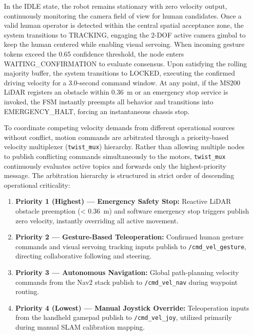 In the IDLE state, the robot remains stationary with zero velocity output, continuously monitoring the camera field of view for human candidates. Once a valid human operator is detected within the central spatial acceptance zone, the system transitions to TRACKING, engaging the 2-DOF active camera gimbal to keep the human centered while enabling visual servoing. When incoming gesture tokens exceed the 0.65 confidence threshold, the node enters WAITING\_CONFIRMATION to evaluate consensus. Upon satisfying the rolling majority buffer, the system transitions to LOCKED, executing the confirmed driving velocity for a 3.0-second command window. At any point, if the MS200 LiDAR registers an obstacle within 0.36~m or an emergency stop service is invoked, the FSM instantly preempts all behavior and transitions into EMERGENCY\_HALT, forcing an instantaneous chassis stop.

To coordinate competing velocity demands from different operational sources without conflict, motion commands are arbitrated through a priority-based velocity multiplexer (\texttt{twist\_mux}) hierarchy. Rather than allowing multiple nodes to publish conflicting commands simultaneously to the motors, \texttt{twist\_mux} continuously evaluates active topics and forwards only the highest-priority message. The arbitration hierarchy is structured in strict order of descending operational criticality:
\begin{enumerate}
    \item \textbf{Priority 1 (Highest) — Emergency Safety Stop:} Reactive LiDAR obstacle preemption (< 0.36~m) and software emergency stop triggers publish zero velocity, instantly overriding all active movement.
    \item \textbf{Priority 2 — Gesture-Based Teleoperation:} Confirmed human gesture commands and visual servoing tracking inputs publish to \texttt{/cmd\_vel\_gesture}, directing collaborative following and steering.
    \item \textbf{Priority 3 — Autonomous Navigation:} Global path-planning velocity commands from the Nav2 stack publish to \texttt{/cmd\_vel\_nav} during waypoint routing.
    \item \textbf{Priority 4 (Lowest) — Manual Joystick Override:} Teleoperation inputs from the handheld gamepad publish to \texttt{/cmd\_vel\_joy}, utilized primarily during manual SLAM calibration mapping.
\end{enumerate}

